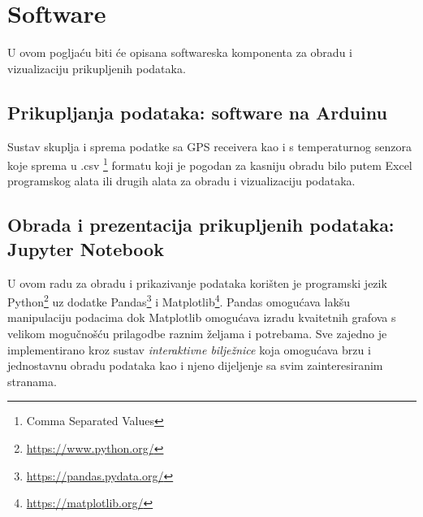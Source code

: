\chapter{Software}
U ovom pogljaću biti će opisana softwareska komponenta za obradu i vizualizaciju prikupljenih podataka.
\section{Prikupljanja podataka: software na Arduinu}
Sustav skuplja i sprema podatke sa GPS receivera kao i s temperaturnog senzora koje sprema u .csv \footnote{Comma Separated Values} formatu koji je pogodan za kasniju obradu bilo putem Excel programskog alata ili drugih alata za obradu i vizualizaciju podataka.


\section{Obrada i prezentacija prikupljenih podataka: Jupyter Notebook}
U ovom radu za obradu i prikazivanje podataka korišten je programski jezik Python\footnote{\href{https://www.python.org/}{https://www.python.org/}} uz dodatke Pandas\footnote{\href{https://pandas.pydata.org/}{https://pandas.pydata.org/}} i Matplotlib\footnote{\href{https://matplotlib.org/}{https://matplotlib.org/}}.
Pandas omogućava lakšu manipulaciju podacima dok Matplotlib omogućava izradu kvaitetnih grafova s velikom mogučnošću prilagodbe raznim željama i potrebama.
Sve zajedno je implementirano kroz sustav \emph{interaktivne bilježnice} koja omogućava brzu i jednostavnu obradu podataka kao i njeno dijeljenje sa svim zainteresiranim stranama.